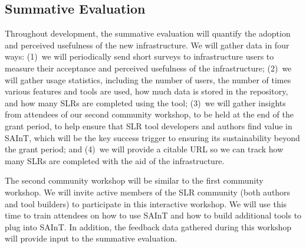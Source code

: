 \subsection{Summative Evaluation}
Throughout development, the summative evaluation will quantify the adoption and perceived usefulness of the new infrastructure.
We will gather data in four ways:
(1)~we will periodically send short surveys to infrastructure users to measure their acceptance and perceived usefulness of the infrastructure;
(2)~we will gather usage statistics, including the number of users, the number of times various features and tools are used, how much data is stored in the repository, and how many SLRs are completed using the tool;
(3)~we will gather insights from attendees of our second community workshop, to be held at the end of the grant period, to help ensure that SLR tool developers and authors find value in SAInT, which will be the key success trigger to ensuring its sustainability beyond the grant period; and
(4)~we will provide a citable URL so we can track how many SLRs are completed with the aid of the infrastructure. 

The second community workshop will be similar to the first community workshop.
We will invite active members of the SLR community (both authors and tool builders) to participate in this interactive workshop.
We will use this time to train attendees on how to use SAInT and how to build additional tools to plug into SAInT.
In addition, the feedback data gathered during this workshop will provide input to the summative evaluation.
